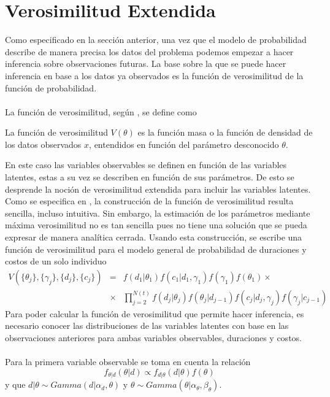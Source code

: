 \section{Verosimilitud Extendida}
Como especificado en la secci\'on anterior, una vez que el modelo de probabilidad describe de manera precisa los datos del problema podemos empezar a hacer inferencia sobre observaciones futuras. La base sobre la que se puede hacer inferencia en base a los datos ya observados es la funci\'on de verosimilitud de la funci\'on de probabilidad.\\
\\
La funci\'on de verosimilitud, seg\'un \cite{held2014applied}, se define como
\begin{defi}
La funci\'on de verosimilitud $V(\theta)$ es la funci\'on masa o la funci\'on de densidad de los datos observados $x$, entendidos en funci\'on del par\'ametro desconocido $\theta$.
\end{defi}
En este caso las variables observables se definen en funci\'on de las variables latentes, estas a su vez se describen en funci\'on de sus par\'ametros. De esto se desprende la noci\'on de verosimilitud extendida para incluir las variables latentes. Como se especifica en \cite{pitt2002constructing}, la construcci\'on de la funci\'on de verosimilitud resulta sencilla, incluso intuitiva. Sin embargo, la estimaci\'on de los par\'ametros mediante m\'axima verosimilitud no es tan sencilla pues no tiene una soluci\'on que se pueda expresar de manera anal\'itica cerrada. Usando esta construcci\'on, se escribe una funci\'on de verosimilitud para el modelo general de probabilidad de duraciones y costos de un solo individuo\\
\begin{eqnarray}
V(\{\theta_j\},\{\gamma_j\},\{d_j\},\{c_j\}) &=& f(d_1|\theta_1)f(c_1|d_1,\gamma_1)f(\gamma_1) f(\theta_1)\times\nonumber\\
& \times & \prod_{j=2}^{N(t)} f(d_j|\theta_j)f(\theta_j|d_{j-1})f(c_j|d_j,\gamma_j)f(\gamma_j|c_{j-1})\nonumber
\end{eqnarray}
Para poder calcular la funci\'on de verosimilitud que permite hacer inferencia, es necesario conocer las distribuciones de las variables latentes con base en las observaciones anteriores para ambas variables observables, duraciones y costos.\\
\\Para la primera variable observable se toma en cuenta la relaci\'on 
\[f_{\theta|d}(\theta|d)\propto f_{d|\theta}(d|\theta)f(\theta)\]
y que $d|\theta \sim Gamma(d|\alpha_d,\theta)$ y $\theta \sim Gamma(\theta|\alpha_\theta,\beta_\theta)$.

